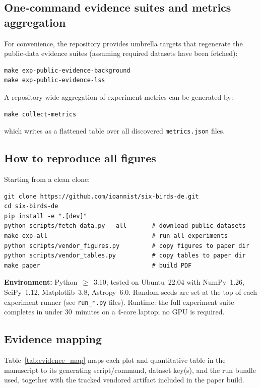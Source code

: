 \documentclass[11pt]{article}
\theoremstyle{definition}
\theoremstyle{plain}
\theoremstyle{remark}
\begin{document}
\subsection{One-command evidence suites and metrics aggregation}\label{app:repro:onecommand}
For convenience, the repository provides umbrella targets that regenerate the public-data evidence suites (assuming required datasets have been fetched):
\begin{verbatim}
make exp-public-evidence-background
make exp-public-evidence-lss
\end{verbatim}
A repository-wide aggregation of experiment metrics can be generated by:
\begin{verbatim}
make collect-metrics
\end{verbatim}
which writes \texttt{} as a flattened table over all discovered \texttt{metrics.json} files.

\subsection{How to reproduce all figures}\label{app:repro:howto}
Starting from a clean clone:
\begin{verbatim}
git clone https://github.com/ioannist/six-birds-de.git
cd six-birds-de
pip install -e ".[dev]"
python scripts/fetch_data.py --all       # download public datasets
make exp-all                             # run all experiments
python scripts/vendor_figures.py         # copy figures to paper dir
python scripts/vendor_tables.py          # copy tables to paper dir
make paper                               # build PDF
\end{verbatim}
\textbf{Environment:} Python~$\geq$~3.10; tested on Ubuntu~22.04 with NumPy~1.26, SciPy~1.12, Matplotlib~3.8, Astropy~6.0.
Random seeds are set at the top of each experiment runner (see \texttt{run\_*.py} files).
Runtime: the full experiment suite completes in under 30~minutes on a 4-core laptop; no GPU is required.

\subsection{Evidence mapping}\label{app:repro:map}
Table~\ref{tab:evidence_map} maps each plot and quantitative table in the manuscript to its generating script/command, dataset key(s), and the run bundle used, together with the tracked vendored artifact included in the paper build.
\end{document}
